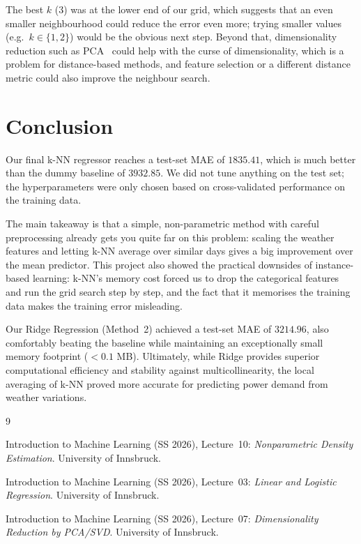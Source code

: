 \documentclass[a4, 10 pt, conference]{ieeeconf}  %
\begin{document}
The best $k$ ($3$) was at the lower end of our grid, which suggests that an
even smaller neighbourhood could reduce the error even more; trying smaller
values (e.g.\ $k \in \{1, 2\}$) would be the obvious next step. Beyond that,
dimensionality reduction such as PCA~\cite{vo-pca} could help with the curse
of dimensionality, which is a problem for distance-based methods, and feature
selection or a different distance metric could also improve the neighbour
search.

\section{Conclusion}
\label{sec:con}

Our final k-NN regressor reaches a test-set MAE of $\mathbf{1835.41}$, which
is much better than the dummy baseline of $3932.85$. We did not tune anything
on the test set; the hyperparameters were only chosen based on cross-validated
performance on the training data.

The main takeaway is that a simple, non-parametric method with careful
preprocessing already gets you quite far on this problem: scaling the weather
features and letting k-NN average over similar days gives a big improvement
over the mean predictor. This project also showed the practical downsides of
instance-based learning: k-NN's memory cost forced us to drop the categorical
features and run the grid search step by step, and the fact that it memorises
the training data makes the training error misleading. 

Our Ridge Regression (Method~2) achieved a test-set MAE of $3214.96$, also comfortably beating the baseline while maintaining an exceptionally small memory footprint ($<0.1$ MB). Ultimately, while Ridge provides superior computational efficiency and stability against multicollinearity, the local averaging of k-NN proved more accurate for predicting power demand from weather variations.


\begin{thebibliography}{9}

Introduction to Machine Learning (SS 2026), Lecture~10:
\emph{Nonparametric Density Estimation}. University of Innsbruck.

Introduction to Machine Learning (SS 2026), Lecture~03:
\emph{Linear and Logistic Regression}. University of Innsbruck.

Introduction to Machine Learning (SS 2026), Lecture~07:
\emph{Dimensionality Reduction by PCA/SVD}. University of Innsbruck.

\end{thebibliography}
\end{document}
